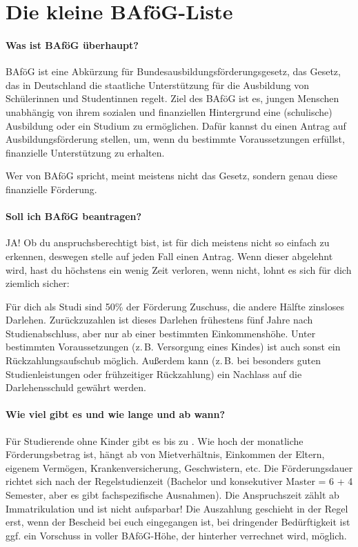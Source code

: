 
\vspace{-2mm}
\section{Die kleine BAföG-Liste}

\paragraph{Was ist BAföG überhaupt?}
BAföG ist eine Abkürzung für \glqq{}Bundesausbildungsförderungsgesetz\grqq{}, das Gesetz, das in Deutschland die staatliche Unterstützung für die Ausbildung von Schülerinnen und Studentinnen regelt. Ziel des BAföG ist es, jungen Menschen unabhängig von ihrem sozialen und finanziellen Hintergrund eine (schulische) Ausbildung oder ein Studium zu ermöglichen. Dafür kannst du einen \glqq{}Antrag auf Ausbildungsförderung\grqq{} stellen, um, wenn du bestimmte Voraussetzungen erfüllst, finanzielle Unterstützung zu erhalten. 

Wer von BAföG spricht, meint meistens nicht das Gesetz, sondern genau diese finanzielle Förderung.

\vspace{-2mm}
\paragraph{Soll ich BAföG beantragen?}
JA! Ob du anspruchsberechtigt bist, ist für dich meistens nicht so einfach zu erkennen, deswegen stelle auf jeden Fall einen Antrag. Wenn dieser abgelehnt wird, hast du höchstens ein wenig Zeit verloren, wenn nicht, lohnt es sich für dich ziemlich sicher:

Für dich als Studi sind 50\% der Förderung Zuschuss, die andere Hälfte zinsloses Darlehen. Zurückzuzahlen ist dieses Darlehen frühestens fünf Jahre nach Studienabschluss, aber nur ab einer bestimmten Einkommenshöhe. Unter bestimmten Voraussetzungen (z.\,B. Versorgung eines Kindes) ist auch sonst ein Rückzahlungsaufschub möglich. Außerdem kann (z.\,B. bei besonders guten Studienleistungen oder frühzeitiger Rückzahlung) ein Nachlass auf die Darlehensschuld gewährt werden.

\vspace{-2mm}
\paragraph{Wie viel gibt es und wie lange und ab wann?}
Für Studierende ohne Kinder gibt es bis zu \bafoeghoechstsatz. Wie hoch der monatliche Förderungsbetrag ist, hängt ab von Mietverhältnis, Einkommen der Eltern, eigenem Vermögen, Krankenversicherung, Geschwistern, etc. Die Förderungsdauer richtet sich nach der Regelstudienzeit (Bachelor und konsekutiver Master = 6 + 4 Semester, aber es gibt fachspezifische Ausnahmen). Die Anspruchszeit zählt ab Immatrikulation und ist nicht aufsparbar! Die Auszahlung geschieht in der Regel erst, wenn der Bescheid bei euch eingegangen ist, bei dringender Bedürftigkeit ist ggf. ein Vorschuss in voller BAföG-Höhe, der hinterher verrechnet wird, möglich.

